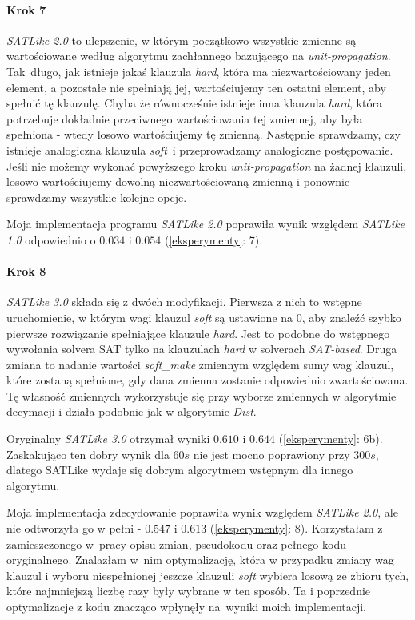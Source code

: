 \documentclass[shortabstract]{iithesis}
\begin{document}
\paragraph{Krok 7} \textit{SATLike 2.0} to ulepszenie, w którym początkowo wszystkie zmienne są wartościowane według algorytmu zachłannego bazującego na \textit{unit-propagation}. Tak~długo, jak istnieje jakaś klauzula \textit{hard}, która ma niezwartościowany jeden element, a pozostałe nie spełniają jej, wartościujemy ten ostatni element, aby spełnić tę klauzulę. Chyba że równocześnie istnieje inna klauzula \textit{hard}, która potrzebuje dokładnie przeciwnego wartościowania tej zmiennej, aby była spełniona - wtedy losowo wartościujemy tę zmienną. Następnie sprawdzamy, czy istnieje analogiczna klauzula \textit{soft}~i przeprowadzamy analogiczne postępowanie. Jeśli nie możemy wykonać powyższego kroku \textit{unit-propagation} na żadnej klauzuli, losowo wartościujemy dowolną niezwartościowaną zmienną i ponownie sprawdzamy wszystkie kolejne opcje.

Moja implementacja programu \textit{SATLike 2.0} poprawiła wynik względem \textit{SATLike 1.0} odpowiednio o $0.034$ i $0.054$ (\ref{eksperymenty}: 7).

\paragraph{Krok 8} 
\textit{SATLike 3.0} składa się z dwóch modyfikacji. Pierwsza z nich to wstępne uruchomienie, w którym wagi klauzul \textit{soft} są ustawione na $0$, aby znaleźć szybko pierwsze rozwiązanie spełniające klauzule \textit{hard}. Jest to podobne do wstępnego wywołania solvera SAT tylko na klauzulach \textit{hard} w solverach \textit{SAT-based}. Druga zmiana to nadanie wartości \textit{soft\_make} zmiennym względem sumy wag klauzul, które zostaną spełnione, gdy dana zmienna zostanie odpowiednio zwartościowana. Tę własność zmiennych wykorzystuje się przy wyborze zmiennych w algorytmie decymacji i działa podobnie jak w algorytmie \textit{Dist}.  

Oryginalny \textit{SATLike 3.0} otrzymał wyniki $0.610$ i $0.644$ (\ref{eksperymenty}: 6b). Zaskakująco ten dobry wynik dla $60s$ nie jest mocno poprawiony przy $300s$, dlatego SATLike wydaje się dobrym algorytmem wstępnym dla innego algorytmu.

Moja implementacja zdecydowanie poprawiła wynik względem \textit{SATLike 2.0}, ale nie odtworzyła go w pełni - $0.547$ i $0.613$ (\ref{eksperymenty}: 8). Korzystałam z zamieszczonego w~pracy opisu zmian, pseudokodu oraz pełnego kodu oryginalnego. Znalazłam w~nim optymalizację, która w przypadku zmiany wag klauzul i wyboru niespełnionej jeszcze klauzuli \textit{soft} wybiera losową ze zbioru tych, które najmniejszą liczbę razy były wybrane w ten sposób. Ta i poprzednie optymalizacje z kodu znacząco wpłynęły na~wyniki moich implementacji.
\end{document}
